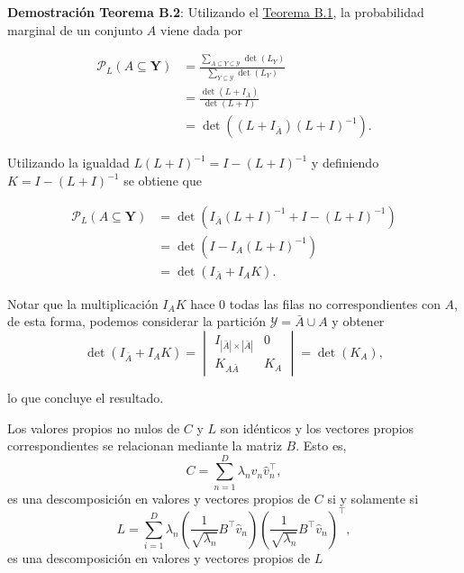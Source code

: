\begin{appendixs}
    \vspace{0.2cm}
    
    \noindent \textbf{Demostración Teorema B.2}: 
    Utilizando el \hyperlink{Teorema B.1}{Teorema B.1}, la probabilidad marginal de un conjunto $A$ viene dada por 

    \begin{align*}
    \mathcal{P}_{L}(A \subseteq \mathbf{Y}) & = \frac{\sum_{A \subseteq Y \subseteq \mathcal{Y}}\det(L_Y)}{\sum_{Y \subseteq \mathcal{Y}}\det(L_Y)} \\
    & = \frac{\det(L + I_{\bar{A}})}{\det(L+I)} \\
    & = \det((L + I_{\bar{A}})(L+I)^{-1}) . 
    \end{align*}
    
    \noindent Utilizando la igualdad $L(L+I)^{-1} = I - (L+I)^{-1}$ y definiendo $K = I - (L+I)^{-1}$ se obtiene que 
    
    \begin{align*}
    \mathcal{P}_L(A \subseteq \mathbf{Y}) & = \det(I_{\bar{A}}(L+I)^{-1} + I - (L+I)^{-1}) \\
    & = \det(I - I_{A}(L+I)^{-1}) \\
    &= \det(I_{\bar{A}} + I_{A}K) . 
    \end{align*} 
    
    \noindent Notar que la multiplicación $I_{A}K$ hace $0$ todas las filas no correspondientes con $A$, de esta forma, podemos considerar la partición $\mathcal{Y} = \bar{A} \cup A$ y obtener
    \[
    \det(I_{\bar{A}} + I_{A}K) = 
    \begin{vmatrix}
    I_{|\bar{A}| \times |\bar{A}| } & 0 \\
    K_{A\bar{A}} & K_A
    \end{vmatrix} = 
    \det(K_A) , 
    \]
    
    \noindent lo que concluye el resultado. 
    
    \begin{teo}\hypertarget{Teorema B.3}{}
    Los valores propios no nulos de $C$ y $L$ son idénticos y los vectores propios correspondientes se relacionan mediante la matriz $B$. Esto es, 
    \[ 
    C = \sum_{n=1}^D \lambda_n\hat{v}_n\hat{v}^{\top}_n , 
    \]
    es una descomposición en valores y vectores propios de $C$ si y solamente si 
    \[
    L = \sum_{i=1}^D \lambda_n \left ( \frac{1}{\sqrt{\lambda_n}}B^{\top}\hat{v}_n\right ) \left ( \frac{1}{\sqrt{\lambda_n}}B^{\top}\hat{v}_n\right )^{\top} , 
    \]
    es una descomposición en valores y vectores propios de $L$
    \end{teo}
    

\end{appendixs}
